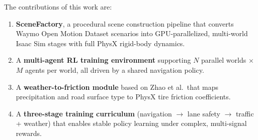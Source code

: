 The contributions of this work are:
\begin{enumerate}
  \item \textbf{SceneFactory}, a procedural scene construction pipeline that converts Waymo Open Motion Dataset scenarios into GPU-parallelized, multi-world Isaac Sim stages with full PhysX rigid-body dynamics.
  \item A \textbf{multi-agent RL training environment} supporting $N$ parallel worlds $\times$ $M$ agents per world, all driven by a shared navigation policy.
  \item A \textbf{weather-to-friction module} based on Zhao et al.\ that maps precipitation and road surface type to PhysX tire friction coefficients.
  \item A \textbf{three-stage training curriculum} (navigation $\to$ lane safety $\to$ traffic + weather) that enables stable policy learning under complex, multi-signal rewards.
\end{enumerate}
%

